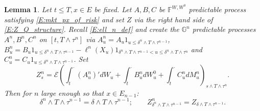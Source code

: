 \documentclass[11pt, letterpaper]{amsart}
\newtheorem{lemma}[theorem]{Lemma}
\theoremstyle{definition}
\theoremstyle{remark}
\numberwithin{equation}{section}
\newcommand{\filt}{\mathbb{F}}
\newcommand{\filtg}{\mathbb{G}}
\newcommand{\EN}{\mathcal{E}}
\begin{document}
\begin{lemma}\label{L:Z_n_to_Z} Let $t\leq T, x\in E$ be fixed. Let $A,B,C$ be $\filt^{W,W^0}$ predictable process satisfying \eqref{E:mkt_px_of_risk} and  set $Z$ via the right hand side of \eqref{E:Z_Q_structure}. Recall \eqref{E:ell_n_def} and create the $\filtg^n$ predictable processes $A^n,B^n,C^n$ on $[t,T\wedge\tau^n]$ via $A^n_u = A_u1_{u\leq \delta^n \wedge T\wedge \tau^{n-1}}$, $B^n_u = B_u 1_{u\leq \delta^n \wedge T\wedge \tau^{n-1}} - \ell^n(X_u)1_{\delta^n\wedge T\wedge \tau^{n-1} < u \leq \delta^n\wedge T\wedge\tau^n}$ and $C^n_u = C_u1_{u\leq \delta^n \wedge T\wedge \tau^{n-1}}$.
Set
\begin{equation*}
Z^n_s =\EN\left(\int_t^\cdot (A^n_u)'dW_u + \int_t^\cdot B^n_u dW^0_u + \int_{t}^\cdot C^n_u dM^n_u\right)_{s\wedge T\wedge \tau^n}.
\end{equation*}
Then for $n$ large enough so that $x\in E_{n-1}$:
\begin{equation}\label{E:Z_n_to_Z_lem}
\delta^n\wedge T\wedge\tau^{n-1} = \delta\wedge T\wedge\tau^{n-1};\qquad Z^n_{\delta^n\wedge T\wedge\tau^{n-1}} = Z_{\delta\wedge T\wedge\tau^{n-1}}.
\end{equation}
\end{lemma}
\end{document}
